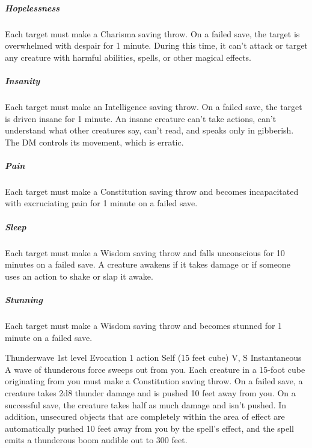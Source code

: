\documentclass[10pt,a4paper,twoside,bg=print,twocolumn,openany,nodeprecatedcode]{dndbook}
\begin{document}
\subparagraph{Hopelessness}
Each target must make a Charisma saving throw. On a failed save, the target is overwhelmed with despair for 1 minute. During this time, it can't attack or target any creature with harmful abilities, spells, or other magical effects.
\subparagraph{Insanity}
Each target must make an Intelligence saving throw. On a failed save, the target is driven insane for 1 minute. An insane creature can't take actions, can't understand what other creatures say, can't read, and speaks only in gibberish. The DM controls its movement, which is erratic.
\subparagraph{Pain}
Each target must make a Constitution saving throw and becomes incapacitated with excruciating pain for 1 minute on a failed save.
\subparagraph{Sleep}
Each target must make a Wisdom saving throw and falls unconscious for 10 minutes on a failed save. A creature awakens if it takes damage or if someone uses an action to shake or slap it awake.
\subparagraph{Stunning}
Each target must make a Wisdom saving throw and becomes stunned for 1 minute on a failed save.


\DndSpellHeader%
{Thunderwave}
{1st level Evocation}
{1 action}
{Self (15 feet cube)}
{V, S}
{Instantaneous}
A wave of thunderous force sweeps out from you. Each creature in a 15-foot cube originating from you must make a Constitution saving throw. On a failed save, a creature takes 2d8 thunder damage and is pushed 10 feet away from you. On a successful save, the creature takes half as much damage and isn't pushed.
In addition, unsecured objects that are completely within the area of effect are automatically pushed 10 feet away from you by the spell's effect, and the spell emits a thunderous boom audible out to 300 feet.
\end{document}

